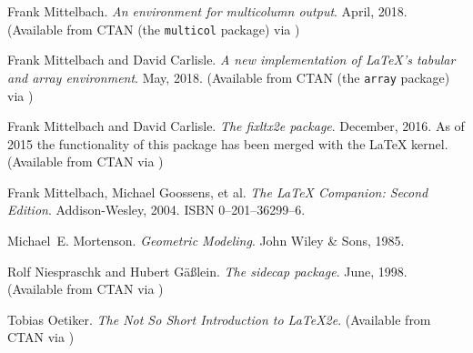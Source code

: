 \begin{thebibliography}{GMS94A}
\begin{comment}
\bibitem[Mit95]{DOCSHORTVRB}
  Frank Mittelbach.
  \newblock \emph{The doc and shortvrb packages}.
  \newblock May, 1995.
  \newblock (Available from CTAN in 
            \url{/macros/latex/base})
\end{comment}

  Frank Mittelbach.
  \newblock \emph{An environment for multicolumn output}.
  \newblock April, 2018.
  \newblock (Available from CTAN (the \texttt{multicol} package) via 
            )

  Frank Mittelbach and David Carlisle.
  \newblock \emph{A new implementation of LaTeX's tabular and array environment}.  \newblock May, 2018.
  \newblock (Available from CTAN (the \texttt{array} package) via
            )

  Frank Mittelbach and David Carlisle.
  \newblock \emph{The fixltx2e package}.
  \newblock December, 2016.
  \newblock As of 2015 the functionality of this package has been
  merged with the \LaTeX{} kernel.
  \newblock (Available from CTAN via 
            )

  Frank Mittelbach, Michael Goossens, et al.
  \newblock \emph{The LaTeX Companion: Second Edition}.
  \newblock Addison-Wesley, 2004.
  \newblock ISBN 0--201--36299--6.

\begin{comment}
\bibitem[Mor99]{MORISON99}
  Stanley Morison.
  \newblock \emph{A Tally of Types}.
  \newblock David R. Godine, 1999.
  \newblock ISBN 1--56792--004--7.
\end{comment}

Michael~E. Mortenson.
\newblock \emph{Geometric Modeling}.
\newblock John Wiley \& Sons, 1985.


  Rolf Niespraschk and Hubert G\"{a}\ss{}lein. 
  \newblock \emph{The sidecap package}.
  \newblock June, 1998.
  \newblock (Available from CTAN via
            )

  Tobias Oetiker.
  \newblock \emph{The Not So Short Introduction to LaTeX2e}.
  \newblock (Available from CTAN via 
            )


\end{thebibliography}
